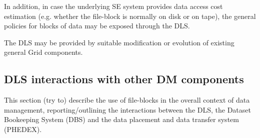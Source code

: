 \documentclass[pdftex]{cmspaper}
\begin{document}
  In addition, in case the underlying SE system provides data access cost
estimation (e.g. whether the file-block is normally on disk or on tape),
the general policies for blocks of data may be exposed through the DLS. 

  The DLS may be provided by suitable modification or evolution of existing
general Grid components.

\subsection{DLS interactions with other DM components}

This section (try to) describe the use of file-blocks in the 
overall context of data management, reporting/outlining the 
interactions between the DLS, the Dataset Bookeeping System (DBS) 
and the data placement and data transfer system (PHEDEX).
\end{document}

